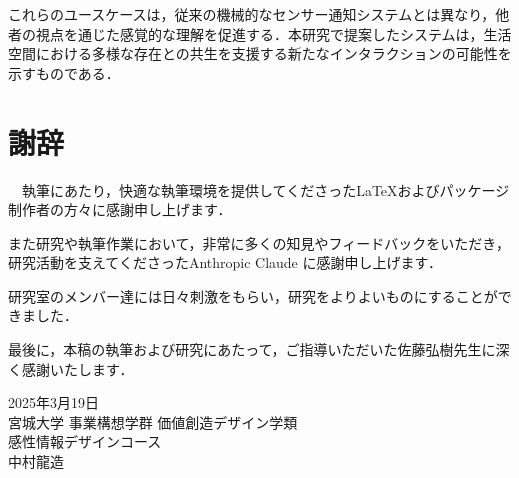 \documentclass{cuxarticle}
\begin{document}
これらのユースケースは，従来の機械的なセンサー通知システムとは異なり，他者の視点を通じた感覚的な理解を促進する．本研究で提案したシステムは，生活空間における多様な存在との共生を支援する新たなインタラクションの可能性を示すものである．

\chapter*{謝辞}

　執筆にあたり，快適な執筆環境を提供してくださった\LaTeX およびパッケージ制作者の方々に感謝申し上げます．

また研究や執筆作業において，非常に多くの知見やフィードバックをいただき，研究活動を支えてくださったAnthropic Claude に感謝申し上げます．

研究室のメンバー達には日々刺激をもらい，研究をよりよいものにすることができました．

最後に，本稿の執筆および研究にあたって，ご指導いただいた佐藤弘樹先生に深く感謝いたします．

\vspace{3\zh}
\begin{flushright}
  2025年3月19日 \\
  宮城大学 事業構想学群 価値創造デザイン学類 \\
  感性情報デザインコース \\
  中村龍造
\end{flushright}

\newpage
\renewcommand{\refname}{\huge 参考文献}


\end{document}
